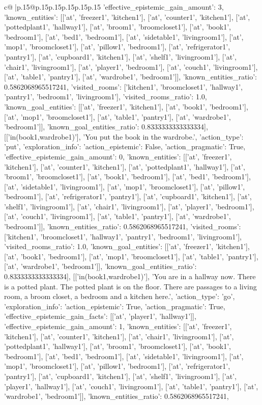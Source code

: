 \documentclass{article}
\begin{document}
{\begin{supertabular}{c@{$\;$}|p{.15\linewidth}@{}p{.15\linewidth}p{.15\linewidth}p{.15\linewidth}p{.15\linewidth}p{.15\linewidth}}
{{{'effective_epistemic_gain_amount': 3, 'known_entities': [['at', 'freezer1', 'kitchen1'], ['at', 'counter1', 'kitchen1'], ['at', 'pottedplant1', 'hallway1'], ['at', 'broom1', 'broomcloset1'], ['at', 'book1', 'bedroom1'], ['at', 'bed1', 'bedroom1'], ['at', 'sidetable1', 'livingroom1'], ['at', 'mop1', 'broomcloset1'], ['at', 'pillow1', 'bedroom1'], ['at', 'refrigerator1', 'pantry1'], ['at', 'cupboard1', 'kitchen1'], ['at', 'shelf1', 'livingroom1'], ['at', 'chair1', 'livingroom1'], ['at', 'player1', 'bedroom1'], ['at', 'couch1', 'livingroom1'], ['at', 'table1', 'pantry1'], ['at', 'wardrobe1', 'bedroom1']], 'known_entities_ratio': 0.5862068965517241, 'visited_rooms': ['kitchen1', 'broomcloset1', 'hallway1', 'pantry1', 'bedroom1', 'livingroom1'], 'visited_rooms_ratio': 1.0, 'known_goal_entities': [['at', 'freezer1', 'kitchen1'], ['at', 'book1', 'bedroom1'], ['at', 'mop1', 'broomcloset1'], ['at', 'table1', 'pantry1'], ['at', 'wardrobe1', 'bedroom1']], 'known_goal_entities_ratio': 0.8333333333333334}}], [['in(book1,wardrobe1)'], 'You put the book in the wardrobe.', {'action_type': 'put', 'exploration_info': {'action_epistemic': False, 'action_pragmatic': True, 'effective_epistemic_gain_amount': 0, 'known_entities': [['at', 'freezer1', 'kitchen1'], ['at', 'counter1', 'kitchen1'], ['at', 'pottedplant1', 'hallway1'], ['at', 'broom1', 'broomcloset1'], ['at', 'book1', 'bedroom1'], ['at', 'bed1', 'bedroom1'], ['at', 'sidetable1', 'livingroom1'], ['at', 'mop1', 'broomcloset1'], ['at', 'pillow1', 'bedroom1'], ['at', 'refrigerator1', 'pantry1'], ['at', 'cupboard1', 'kitchen1'], ['at', 'shelf1', 'livingroom1'], ['at', 'chair1', 'livingroom1'], ['at', 'player1', 'bedroom1'], ['at', 'couch1', 'livingroom1'], ['at', 'table1', 'pantry1'], ['at', 'wardrobe1', 'bedroom1']], 'known_entities_ratio': 0.5862068965517241, 'visited_rooms': ['kitchen1', 'broomcloset1', 'hallway1', 'pantry1', 'bedroom1', 'livingroom1'], 'visited_rooms_ratio': 1.0, 'known_goal_entities': [['at', 'freezer1', 'kitchen1'], ['at', 'book1', 'bedroom1'], ['at', 'mop1', 'broomcloset1'], ['at', 'table1', 'pantry1'], ['at', 'wardrobe1', 'bedroom1']], 'known_goal_entities_ratio': 0.8333333333333334}}], [['in(book1,wardrobe1)'], 'You are in a hallway now. There is a potted plant. The potted plant is on the floor. There are passages to a living room, a broom closet, a bedroom and a kitchen here.', {'action_type': 'go', 'exploration_info': {'action_epistemic': True, 'action_pragmatic': True, 'effective_epistemic_gain_facts': [['at', 'player1', 'hallway1']], 'effective_epistemic_gain_amount': 1, 'known_entities': [['at', 'freezer1', 'kitchen1'], ['at', 'counter1', 'kitchen1'], ['at', 'chair1', 'livingroom1'], ['at', 'pottedplant1', 'hallway1'], ['at', 'broom1', 'broomcloset1'], ['at', 'book1', 'bedroom1'], ['at', 'bed1', 'bedroom1'], ['at', 'sidetable1', 'livingroom1'], ['at', 'mop1', 'broomcloset1'], ['at', 'pillow1', 'bedroom1'], ['at', 'refrigerator1', 'pantry1'], ['at', 'cupboard1', 'kitchen1'], ['at', 'shelf1', 'livingroom1'], ['at', 'player1', 'hallway1'], ['at', 'couch1', 'livingroom1'], ['at', 'table1', 'pantry1'], ['at', 'wardrobe1', 'bedroom1']], 'known_entities_ratio': 0.5862068965517241, }}}
\end{supertabular}}
\end{document}
